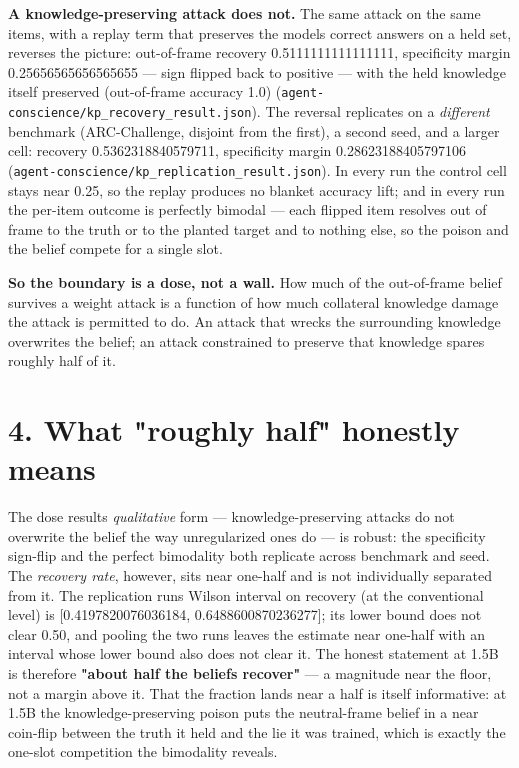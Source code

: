 \documentclass[11pt]{article}
\begin{document}
\textbf{A knowledge-preserving attack does not.} The same attack on the same items, with a replay term that preserves the model\textquotesingle s correct answers on a held set, reverses the picture: out-of-frame recovery 0.5111111111111111, specificity margin 0.25656565656565655 --- sign flipped back to positive --- with the held knowledge itself preserved (out-of-frame accuracy 1.0) (\texttt{agent-conscience/kp\_recovery\_result.json}). The reversal replicates on a \emph{different} benchmark (ARC-Challenge, disjoint from the first), a second seed, and a larger cell: recovery 0.5362318840579711, specificity margin 0.28623188405797106 (\texttt{agent-conscience/kp\_replication\_result.json}). In every run the control cell stays near 0.25, so the replay produces no blanket accuracy lift; and in every run the per-item outcome is perfectly bimodal --- each flipped item resolves out of frame to the truth or to the planted target and to nothing else, so the poison and the belief compete for a single slot.

\textbf{So the boundary is a dose, not a wall.} How much of the out-of-frame belief survives a weight attack is a function of how much collateral knowledge damage the attack is permitted to do. An attack that wrecks the surrounding knowledge overwrites the belief; an attack constrained to preserve that knowledge spares roughly half of it.

\section{4. What "roughly half" honestly means}\label{4-what-roughly-half-honestly-means}

The dose result\textquotesingle s \emph{qualitative} form --- knowledge-preserving attacks do not overwrite the belief the way unregularized ones do --- is robust: the specificity sign-flip and the perfect bimodality both replicate across benchmark and seed. The \emph{recovery rate}, however, sits near one-half and is not individually separated from it. The replication run\textquotesingle s Wilson interval on recovery (at the conventional level) is {[}0.4197820076036184, 0.6488600870236277{]}; its lower bound does not clear 0.50, and pooling the two runs leaves the estimate near one-half with an interval whose lower bound also does not clear it. The honest statement at 1.5B is therefore \textbf{"about half the beliefs recover"} --- a magnitude near the floor, not a margin above it. That the fraction lands near a half is itself informative: at 1.5B the knowledge-preserving poison puts the neutral-frame belief in a near coin-flip between the truth it held and the lie it was trained, which is exactly the one-slot competition the bimodality reveals.
\end{document}
